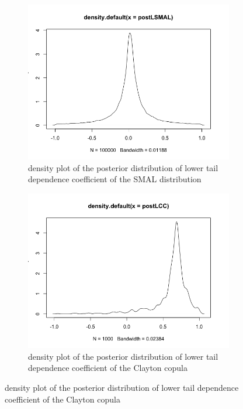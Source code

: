 \documentclass[mstat,12pt]{unswthesis}  %
\numberwithin{equation}{section}
\begin{document}
\begin{figure}[h]
\begin{subfigure}{.42\textwidth}
  \centering
  \includegraphics[width=\linewidth]{postLSMAL.png}  
  \caption{density plot of the posterior distribution of lower tail dependence coefficient of the SMAL distribution}
  \label{fig:sub-first}
\end{subfigure}
\begin{subfigure}{.42\textwidth}
  \centering
  \includegraphics[width=\linewidth]{postLCC2.png}  
  \caption{density plot of the posterior distribution of lower tail dependence coefficient of the Clayton copula}
  \label{fig:sub-second}
\end{subfigure}


\end{figure}
\end{document}

